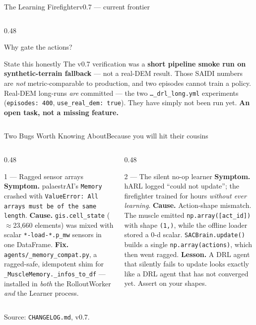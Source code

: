 \documentclass[aspectratio=169,9pt]{beamer}
\newcommand{\code}[1]{{\small\texttt{#1}}}
\newcommand{\gold}[1]{{\color{cslaeaglegold}\textbf{#1}}}
\newcommand{\srcnote}[1]{\vfill{\scriptsize\color{csladarkgray}#1}}
\begin{document}
\begin{frame}{The Learning Firefighter}{v0.7 --- current frontier}
\begin{columns}[T,onlytextwidth]
\begin{column}{0.48\textwidth}
\begin{block}{Why gate the actions?}
      \end{block}
      \begin{alertblock}{State this honestly}
        \small The v0.7 verification was a \textbf{short pipeline smoke run
        on synthetic-terrain fallback} --- not a real-DEM result. Those
        SAIDI numbers are \emph{not} metric-comparable to production, and
        two episodes cannot train a policy.
        \vskip3pt
        Real-DEM long-runs \emph{are} committed --- the two
        \code{\ldots\_drl\_long.yml} experiments
        (\code{episodes: 400}, \code{use\_real\_dem: true}). They have
        simply not been run yet.
        \gold{An open task, not a missing feature.}
      \end{alertblock}
    \end{column}
  \end{columns}
\end{frame}

\begin{frame}{Two Bugs Worth Knowing About}{Because you will hit their cousins}
  \begin{columns}[T,onlytextwidth]
    \begin{column}{0.48\textwidth}
      \begin{block}{1 --- Ragged sensor arrays}
        \small
        \textbf{Symptom.} palaestrAI's \code{Memory} crashed with
        \code{ValueError: All arrays must be of the same length}.
        \vskip3pt
        \textbf{Cause.} \code{gis.cell\_state} ($\approx$23{,}660 elements)
        was mixed with scalar \code{*-load-*.p\_mw} sensors in one
        DataFrame.
        \vskip3pt
        \textbf{Fix.} \code{agents/\_memory\_compat.py}, a ragged-safe,
        idempotent shim for \code{\_MuscleMemory.\_infos\_to\_df} ---
        installed in \emph{both} the RolloutWorker \emph{and} the Learner
        process.
      \end{block}
    \end{column}
    \begin{column}{0.48\textwidth}
      \begin{alertblock}{2 --- The silent no-op learner}
        \small
        \textbf{Symptom.} hARL logged ``could not update''; the firefighter
        trained for hours \emph{without ever learning}.
        \vskip3pt
        \textbf{Cause.} Action-shape mismatch. The muscle emitted
        \code{np.array([act\_id])} with shape \code{(1,)}, while the offline
        loader stored a 0-d scalar. \code{SACBrain.update()} builds a single
        \code{np.array(actions)}, which then went ragged.
        \vskip3pt
        \textbf{Lesson.} A DRL agent that silently fails to update looks
        exactly like a DRL agent that has not converged yet. Assert on your
        shapes.
      \end{alertblock}
    \end{column}
  \end{columns}
  \srcnote{Source: \texttt{CHANGELOG.md}, v0.7.}
\end{frame}
\end{document}
